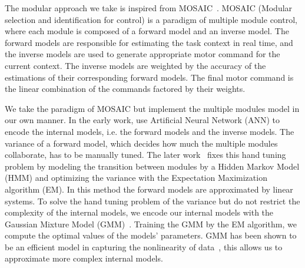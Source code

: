 The modular approach we take is inspired from MOSAIC~\citep{haruno2001mosaic}. MOSAIC (Modular selection and identification for control) is a paradigm of multiple module control, where each module is composed of a forward model and an inverse model. The forward models are responsible for estimating the task context in real time, and the inverse models are used to generate appropriate motor command for the current context. The inverse models are weighted by the accuracy of the estimations of their corresponding forward models. The final motor command is the linear combination of the commands factored by their weights.

We take the paradigm of MOSAIC but implement the multiple modules model in our own manner. In the early work, \citet{wolpert1998multiple} use Artificial Neural Network (ANN) to encode the internal models, i.e. the forward models and the inverse models. The variance of a forward model, which decides how much the multiple modules collaborate, has to be manually tuned. The later work~\citep{haruno2001mosaic} fixes this hand tuning problem by modeling the transition between modules by a Hidden Markov Model (HMM) and optimizing the variance with the Expectation Maximization algorithm (EM). In this method the forward models are approximated by linear systems.
To solve the hand tuning problem of the variance but do not restrict the complexity of the internal models, we encode our internal models with the Gaussian Mixture Model (GMM)~\citep{cohn1996active}.
Training the GMM by the EM algorithm, we compute the optimal values of the models' parameters. GMM has been shown to be an efficient model in capturing the nonlinearity of data~\citep{calinon2007incremental,sauser2011iterative,huang2013learning}, this allows us to approximate more complex internal models.



